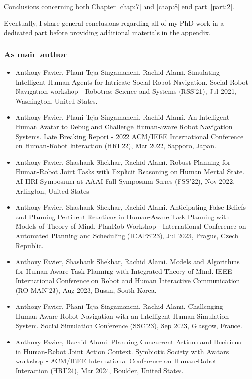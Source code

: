 Conclusions concerning both Chapter \ref{chap:7} and \ref{chap:8} end part~\ref{part:2}.

Eventually, I share general conclusions regarding all of my PhD work in a dedicated part before providing additional materials in the appendix.  


\subsubsection*{As main author}
\begin{itemize}

    \item Anthony Favier, Phani-Teja Singamaneni, Rachid Alami. Simulating Intelligent Human Agents for Intricate Social Robot Navigation. Social Robot Navigation workshop - Robotics: Science and Systems (RSS'21), Jul 2021, Washington, United States. 
    \item Anthony Favier, Phani-Teja Singamaneni, Rachid Alami. An Intelligent Human Avatar to Debug and Challenge Human-aware Robot Navigation Systems. Late Breaking Report - 2022 ACM/IEEE International Conference on Human-Robot Interaction (HRI'22), Mar 2022, Sapporo, Japan. 
    \item Anthony Favier, Shashank Shekhar, Rachid Alami. Robust Planning for Human-Robot Joint Tasks with Explicit Reasoning on Human Mental State. AI-HRI Symposium at AAAI Fall Symposium Series (FSS'22), Nov 2022, Arlington, United States. 
    \item Anthony Favier, Shashank Shekhar, Rachid Alami. Anticipating False Beliefs and Planning Pertinent Reactions in Human-Aware Task Planning with Models of Theory of Mind. PlanRob Workshop - International Conference on Automated Planning and Scheduling (ICAPS'23), Jul 2023, Prague, Czech Republic. 
    \item Anthony Favier, Shashank Shekhar, Rachid Alami. Models and Algorithms for Human-Aware Task Planning with Integrated Theory of Mind. IEEE International Conference on Robot and Human Interactive Communication (RO-MAN'23), Aug 2023, Busan, South Korea. 
    \item Anthony Favier, Phani Teja Singamaneni, Rachid Alami. Challenging Human-Aware Robot Navigation with an Intelligent Human Simulation System. Social Simulation Conference (SSC'23), Sep 2023, Glasgow, France. 
    \item Anthony Favier, Rachid Alami. Planning Concurrent Actions and Decisions in Human-Robot Joint Action Context. Symbiotic Society with Avatars workshop - ACM/IEEE International Conference on Human-Robot Interaction (HRI'24), Mar 2024, Boulder, United States.

\end{itemize}
    

